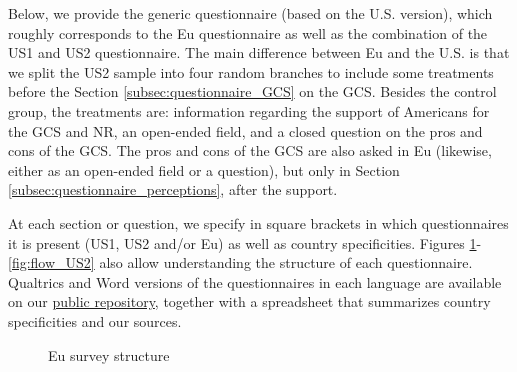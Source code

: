 Below, we provide the generic questionnaire (based on the U.S. version), which roughly corresponds to the Eu questionnaire as well as the combination of the US1 and US2 questionnaire. The main difference between Eu and the U.S. is that we split the US2 sample into four random branches to include some treatments before the Section \ref{subsec:questionnaire_GCS} on the GCS. Besides the control group, the treatments are: information regarding the support of Americans for the GCS and NR, an open-ended field, and a closed question on the pros and cons of the GCS. The pros and cons of the GCS are also asked in Eu (likewise, either as an open-ended field or a question), but only in Section \ref{subsec:questionnaire_perceptions}, after the support. 

At each section or question, we specify in square brackets in which questionnaires it is present (US1, US2 and/or Eu) as well as country specificities. Figures \ref{fig:flow_Eu}-\ref{fig:flow_US2} also allow understanding the structure of each questionnaire. Qualtrics and Word versions of the questionnaires in each language are available on our \href{https://github.com/bixiou/global_tax_attitudes/tree/main/questionnaire}{public repository}, together with a spreadsheet that summarizes country specificities and our sources.

\begin{figure}[h!]
    \caption{Eu survey structure}\label{fig:flow_Eu}
\end{figure}

